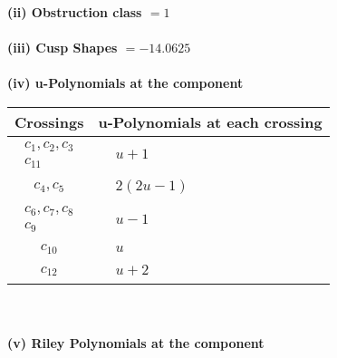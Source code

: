 \documentclass[1p]{elsarticle_modified}
\theoremstyle{definition}
\begin{document}
\flushleft \textbf{(ii) Obstruction class $= 1$}\\~\\
\flushleft \textbf{(iii) Cusp Shapes $= -14.0625$}\\~\\
\newpage\renewcommand{\arraystretch}{1}
\flushleft \textbf{(iv) u-Polynomials at the component}\newline \\
\begin{tabular}{m{50pt}|m{274pt}}
Crossings & \hspace{64pt}u-Polynomials at each crossing \\
\hline $$\begin{aligned}c_{1},c_{2},c_{3}\\c_{11}\end{aligned}$$&$\begin{aligned}
&u+1
\end{aligned}$\\
\hline $$\begin{aligned}c_{4},c_{5}\end{aligned}$$&$\begin{aligned}
&2(2 u-1)
\end{aligned}$\\
\hline $$\begin{aligned}c_{6},c_{7},c_{8}\\c_{9}\end{aligned}$$&$\begin{aligned}
&u-1
\end{aligned}$\\
\hline $$\begin{aligned}c_{10}\end{aligned}$$&$\begin{aligned}
&u
\end{aligned}$\\
\hline $$\begin{aligned}c_{12}\end{aligned}$$&$\begin{aligned}
&u+2
\end{aligned}$\\
\hline
\end{tabular}\\~\\
\newpage\renewcommand{\arraystretch}{1}
\flushleft \textbf{(v) Riley Polynomials at the component}\newline \\
\end{document}
